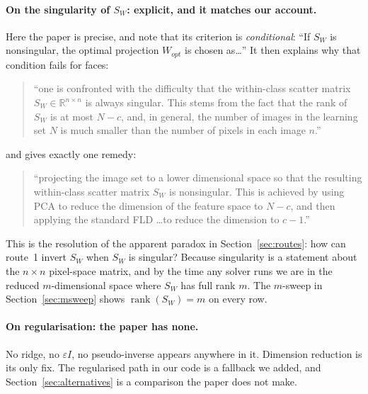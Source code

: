 \documentclass[11pt]{article}
\theoremstyle{definition}
\theoremstyle{remark}
\newcommand{\Sw}{S_W}
\begin{document}
\paragraph{On the singularity of $\Sw$: explicit, and it matches our account.}
Here the paper is precise, and note that its criterion is \emph{conditional}:
``If $\Sw$ is nonsingular, the optimal projection $W_{opt}$ is chosen as\ldots''
It then explains why that condition fails for faces:
\begin{quote}
``one is confronted with the difficulty that the within-class scatter matrix
$\Sw \in \mathbb{R}^{n\times n}$ is always singular. This stems from the fact
that the rank of $\Sw$ is at most $N-c$, and, in general, the number of images
in the learning set $N$ is much smaller than the number of pixels in each image
$n$.''
\end{quote}
and gives exactly one remedy:
\begin{quote}
``projecting the image set to a lower dimensional space so that the resulting
within-class scatter matrix $\Sw$ is nonsingular. This is achieved by using PCA
to reduce the dimension of the feature space to $N-c$, and then applying the
standard FLD \ldots to reduce the dimension to $c-1$.''
\end{quote}
This is the resolution of the apparent paradox in Section~\ref{sec:routes}: how
can route~1 invert $\Sw$ when $\Sw$ is singular? Because singularity is a
statement about the $n\times n$ pixel-space matrix, and by the time any solver
runs we are in the reduced $m$-dimensional space where $\Sw$ has full rank $m$.
The $m$-sweep in Section~\ref{sec:msweep} shows $\operatorname{rank}(\Sw)=m$ on
every row.

\paragraph{On regularisation: the paper has none.}
No ridge, no $\varepsilon I$, no pseudo-inverse appears anywhere in it.
Dimension reduction is its only fix. The regularised path in our code is a
fallback we added, and Section~\ref{sec:alternatives} is a comparison the paper
does not make.
\end{document}
